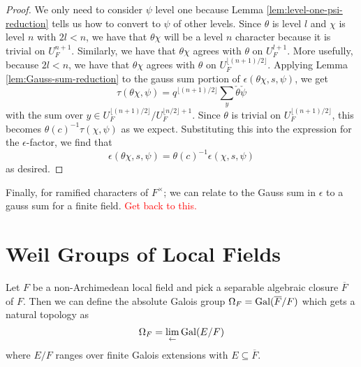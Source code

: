 \begin{proof}
  We only need to consider $\psi$ level one because Lemma \ref{lem:level-one-psi-reduction} tells us how to convert to $\psi$ of other levels.
  Since $\theta$ is level $l$ and $\chi$ is level $n$ with $2l < n$, we have that $\theta\chi$ will be a level $n$ character because it is trivial on $U_F^{n+1}$.
  Similarly, we have that $\theta \chi$ agrees with $\theta$ on $U_F^{l+1}$.
  More usefully, because $2l < n$, we have that $\theta \chi$ agrees with $\theta$ on $U_F^{\lfloor (n+1)/2 \rfloor}$.
  Applying Lemma \ref{lem:Gauss-sum-reduction} to the gauss sum portion of $\epsilon(\theta\chi,s,\psi)$, we get
  \[\tau(\theta \chi, \psi) = q^{\lfloor (n+1)/2\rfloor} \sum_y \check{\theta}\check{\psi}\]
  with the sum over $y \in U_F^{\lfloor (n+1)/2 \rfloor}/U_F^{\lfloor n/2 \rfloor + 1}$.
  Since $\theta$ is trivial on $U_F^{\lfloor (n+1)/2 \rfloor}$, this becomes $\theta(c)^{-1} \tau(\chi, \psi)$ as we expect.
  Substituting this into the expression for the $\epsilon$-factor, we find that
  \[\epsilon(\theta\chi, s, \psi) = \theta(c)^{-1} \epsilon(\chi, s, \psi)\]
  as desired.
\end{proof}

Finally, for ramified characters of $F^\times$; we can relate to the Gauss sum in $\epsilon$ to a gauss sum for a finite field.
\textcolor{red}{Get back to this.}
\section{Weil Groups of Local Fields}
\label{sec:weil-group}
Let $F$ be a non-Archimedean local field and pick a separable algebraic closure $\overline{F}$ of $F$.
Then we can define the absolute Galois group $\Omega_F = \textrm{Gal}(\overline{F}/F)$ which gets a natural topology as
\[\Omega_F = \lim_{\leftarrow} \textrm{Gal}(E/F)\]
where $E/F$ ranges over finite Galois extensions with $E \subseteq \overline{F}$.

